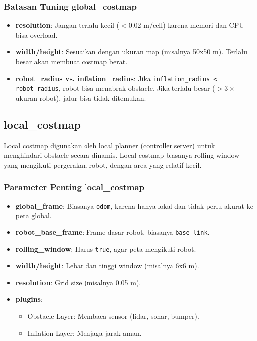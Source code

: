 \documentclass{article}
\begin{document}
\subsubsection*{Batasan Tuning global\_costmap}
\begin{itemize}
  \item \textbf{resolution}: Jangan terlalu kecil ($<0.02$ m/cell) karena memori dan CPU bisa overload.
  \item \textbf{width/height}: Sesuaikan dengan ukuran map (misalnya 50x50 m). Terlalu besar akan membuat costmap berat.
  \item \textbf{robot\_radius vs. inflation\_radius}: Jika \texttt{inflation\_radius < robot\_radius}, robot bisa menabrak obstacle. Jika terlalu besar ($>3 \times$ ukuran robot), jalur bisa tidak ditemukan.
\end{itemize}

\subsection{local\_costmap}
Local costmap digunakan oleh local planner (controller server) untuk menghindari obstacle secara dinamis. Local costmap biasanya rolling window yang mengikuti pergerakan robot, dengan area yang relatif kecil.

\subsubsection*{Parameter Penting local\_costmap}
\begin{itemize}
  \item \textbf{global\_frame}: Biasanya \texttt{odom}, karena hanya lokal dan tidak perlu akurat ke peta global.
  \item \textbf{robot\_base\_frame}: Frame dasar robot, biasanya \texttt{base\_link}.
  \item \textbf{rolling\_window}: Harus \texttt{true}, agar peta mengikuti robot.
  \item \textbf{width/height}: Lebar dan tinggi window (misalnya 6x6 m).
  \item \textbf{resolution}: Grid size (misalnya 0.05 m).
  \item \textbf{plugins}:
        \begin{itemize}
          \item Obstacle Layer: Membaca sensor (lidar, sonar, bumper).
          \item Inflation Layer: Menjaga jarak aman.
        \end{itemize}
\end{itemize}
\end{document}
